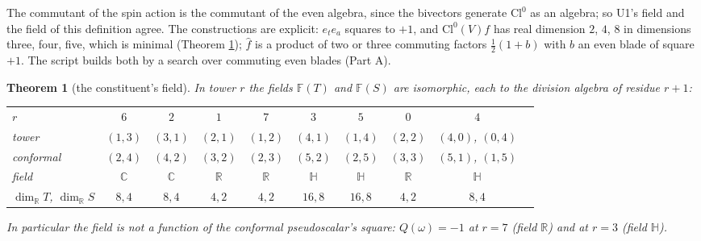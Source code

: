 \documentclass[11pt]{article}
\newtheorem{theorem}{Theorem}[section]
\theoremstyle{definition}
\newcommand{\Cl}{\mathrm{Cl}}
\newcommand{\R}{\mathbb{R}}
\newcommand{\C}{\mathbb{C}}
\newcommand{\HH}{\mathbb{H}}
\newcommand{\F}{\mathbb{F}}
\newcommand{\hf}{\hat{f}}
\begin{document}
The commutant of the spin action is the commutant of the even algebra, since the bivectors generate $\Cl^{0}$ as an algebra; so U1's field and the field of this definition agree. The constructions are explicit: $e_{t}e_{a}$ squares to $+1$, and $\Cl^{0}(V)f$ has real dimension $2$, $4$, $8$ in dimensions three, four, five, which is minimal (Theorem \ref{thm:fields}); $\hf$ is a product of two or three commuting factors $\tfrac{1}{2}(1 + b)$ with $b$ an even blade of square $+1$. The script builds both by a search over commuting even blades (Part A).

\begin{theorem}[the constituent's field]\label{thm:fields}
In tower $r$ the fields $\F(T)$ and $\F(S)$ are isomorphic, each to the division algebra of residue $r + 1$:
\begin{center}\small
\begin{tabular}{@{}lccccccccc@{}}
\toprule
$r$ & $6$ & $2$ & $1$ & $7$ & $3$ & $5$ & $0$ & $4$ \\
tower & $(1,3)$ & $(3,1)$ & $(2,1)$ & $(1,2)$ & $(4,1)$ & $(1,4)$ & $(2,2)$ & $(4,0)$, $(0,4)$ \\
conformal & $(2,4)$ & $(4,2)$ & $(3,2)$ & $(2,3)$ & $(5,2)$ & $(2,5)$ & $(3,3)$ & $(5,1)$, $(1,5)$ \\
field & $\C$ & $\C$ & $\R$ & $\R$ & $\HH$ & $\HH$ & $\R$ & $\HH$ \\
$\dim_{\R} T$, $\dim_{\R} S$ & $8, 4$ & $8, 4$ & $4, 2$ & $4, 2$ & $16, 8$ & $16, 8$ & $4, 2$ & $8, 4$ \\
\bottomrule
\end{tabular}
\end{center}
In particular the field is not a function of the conformal pseudoscalar's square: $Q(\omega) = -1$ at $r = 7$ (field $\R$) and at $r = 3$ (field $\HH$).
\end{theorem}
\end{document}
